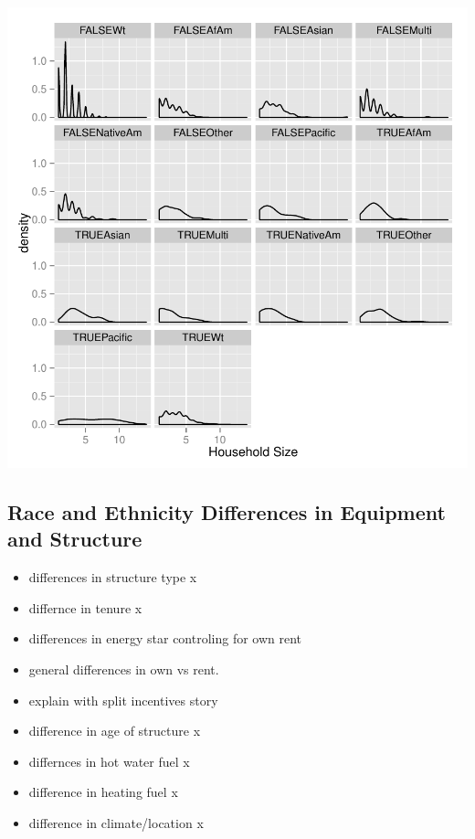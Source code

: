 \documentclass{article}
\begin{document}
\includegraphics{DraftEdwardsWoods-007}


  \subsection{Race and Ethnicity Differences in Equipment and Structure}

\begin{itemize}
  \item differences in structure type x
  \item differnce in tenure x
  \item differences in energy star controling for own rent
  \item general differences in own vs rent.  
  \item explain with split incentives story
  \item difference in age of structure x
  \item differnces in hot water fuel x
  \item difference in heating fuel x
    \item difference in climate/location x
\end{itemize}
  
\end{document}
